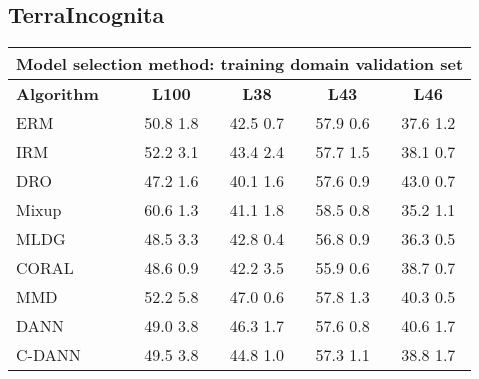 \documentclass{article}
\begin{document}
\subsection{TerraIncognita}
\begin{center}
\begin{tabular}{lcccc}
\toprule
\multicolumn{5}{c}{\textbf{Model selection method: training domain validation set}} \\
\midrule
\textbf{Algorithm}    & \textbf{L100}             & \textbf{L38}              & \textbf{L43}              & \textbf{L46}              \\
\midrule
ERM                       & 50.8  1.8            & 42.5  0.7            & 57.9  0.6            & 37.6  1.2            \\
IRM                       & 52.2  3.1            & 43.4  2.4            & 57.7  1.5            & 38.1  0.7            \\
DRO                 & 47.2  1.6            & 40.1  1.6            & 57.6  0.9            & 43.0  0.7            \\
Mixup                     & 60.6  1.3            & 41.1  1.8            & 58.5  0.8            & 35.2  1.1            \\
MLDG                      & 48.5  3.3            & 42.8  0.4            & 56.8  0.9            & 36.3  0.5            \\
CORAL                     & 48.6  0.9            & 42.2  3.5            & 55.9  0.6            & 38.7  0.7            \\
MMD                       & 52.2  5.8            & 47.0  0.6            & 57.8  1.3            & 40.3  0.5            \\
DANN                       & 49.0  3.8            & 46.3  1.7            & 57.6  0.8            & 40.6  1.7            \\
C-DANN                   & 49.5  3.8            & 44.8  1.0            & 57.3  1.1            & 38.8  1.7            \\
\bottomrule
\end{tabular}
\end{center}
\end{document}
